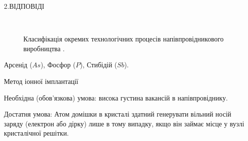 \documentclass[14pt,a4paper]{scrartcl}
\begin{document}
\newpage
\begin{center}2.ВІДПОВІДІ\\ \end{center}



\begin{figure}[h]
\\
\caption{Класифікація окремих технологічних процесів напівпровідникового виробництва .}
\end{figure}

Арсенід ($As$), Фосфор ($P$), Стибідій ($Sb$). 

Метод іонної імплантації\par
{}
Необхідна (обов’язкова) умова: висока густина вакансій в напівпровіднику.\par

Достатня умова: Атом домішки в кристалі здатний генерувати вільний носій заряду (електрон або дірку) лише в тому випадку, якщо він займає місце у вузлі кристалічної решітки.\\
\end{document}
